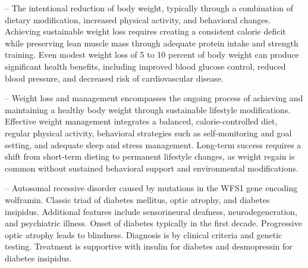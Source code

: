 -- The intentional reduction of body weight, typically through a combination of dietary modification, increased physical activity, and behavioral changes. Achieving sustainable weight loss requires creating a consistent calorie deficit while preserving lean muscle mass through adequate protein intake and strength training. Even modest weight loss of 5 to 10 percent of body weight can produce significant health benefits, including improved blood glucose control, reduced blood pressure, and decreased risk of cardiovascular disease.

-- Weight loss and management encompasses the ongoing process of achieving and maintaining a healthy body weight through sustainable lifestyle modifications. Effective weight management integrates a balanced, calorie-controlled diet, regular physical activity, behavioral strategies such as self-monitoring and goal setting, and adequate sleep and stress management. Long-term success requires a shift from short-term dieting to permanent lifestyle changes, as weight regain is common without sustained behavioral support and environmental modifications.

-- Autosomal recessive disorder caused by mutations in the WFS1 gene encoding wolframin. Classic triad of diabetes mellitus, optic atrophy, and diabetes insipidus. Additional features include sensorineural deafness, neurodegeneration, and psychiatric illness. Onset of diabetes typically in the first decade. Progressive optic atrophy leads to blindness. Diagnosis is by clinical criteria and genetic testing. Treatment is supportive with insulin for diabetes and desmopressin for diabetes insipidus.
